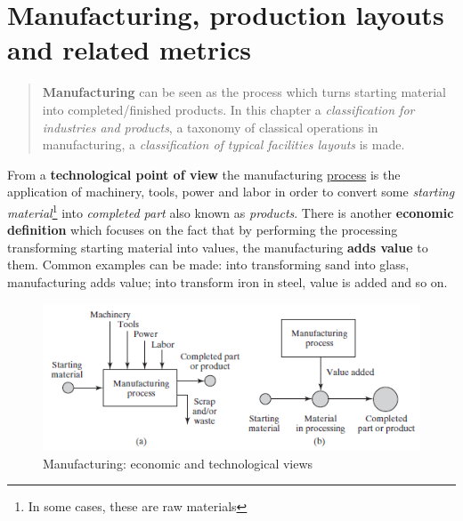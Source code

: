 \chapter{Manufacturing, production layouts and related metrics}
\vspace{-0.5cm}
\minitoc

\begin{quotation}
    \textsf{\noindent\textbf{Manufacturing} can be seen as the process which turns starting material into completed/finished products. In this chapter a \textit{classification for industries and products}, a taxonomy of classical operations in manufacturing, a \textit{classification of typical facilities layouts} is made.}
\end{quotation}
From a \textbf{technological point of view} the manufacturing \underline{process} is the application of machinery, tools, power and labor in order to convert some \textit{starting material}\footnote{
    In some cases, these are raw materials
} into \textit{completed part} also known as \textit{products}. There is another \textbf{economic definition} which focuses on the fact that by performing the processing transforming starting material into values, the manufacturing \textbf{adds value} to them. Common examples can be made: into transforming sand into glass, manufacturing adds value; into transform iron in steel, value is added and so on.

\begin{figure}[h]
    \centering
    \includegraphics[scale=1]{img/manifacturing.png}
    \caption{Manufacturing: economic and technological views}
    \label{fig:manifacturing_views}
\end{figure}
  

